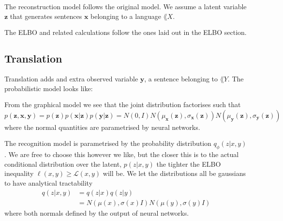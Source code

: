 The reconstruction model follows the original model. We assume a latent variable
$\bm{z}$ that generates sentences $\bm{x}$ belonging to a language $\lang{X}$.

The ELBO and related calculations follow the ones laid out in the ELBO section.

\subsection{Translation}

Translation adds and extra observed variable $\bm{y}$, a sentence belonging to
$\lang{Y}$. The probabilistic model looks like:

\begin{figure}[H]
  \center
\end{figure}

From the graphical model we see that the joint distribution factorises such that
\begin{equation}
  \label{eq:joint_generative}
  p(\bm{\bm{z}}, \bm{x}, \bm{y}) = p(\bm{z})p(\bm{x} | \bm{z})p(\bm{y} | \bm{z}) = N(0, I)N(\mu_{\bm{x}}(\bm{z}), \sigma_{\bm{x}}(\bm{z}))N(\mu_{\bm{y}}(\bm{z}), \sigma_{\bm{y}}(\bm{z}))
\end{equation}
where the normal quantities are parametrised by neural networks.

The recognition model is parametrised by the probability distribution
$q_{\phi}(z | x, y)$. We are free to choose this however we like, but the closer
this is to the actual conditional distribution over the latent, $p(z | x, y)$
the tighter the ELBO inequality $\ell(x, y) \geq \mathcal{L}(x, y)$ will be. We
let the distributions all be gaussians to have analytical tractability
\begin{align*}
  q(z | x, y) & = q(z | x)q(z | y) \\
              & = N(\mu(x), \sigma(x) I) N(\mu(y), \sigma(y) I)
\end{align*}
where both normals defined by the output of neural networks.


